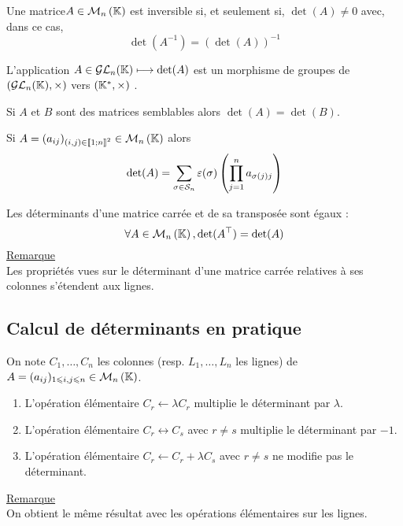 \begin{defprop}
    Une matrice\( A \in  \M{n}\) est inversible si, et seulement si, \(\det(A) \neq 0\) avec, dans ce cas, \[\det(A^{-1}) = (\det(A))^{-1}\]
\end{defprop}

\begin{defprop}
    L’application \(A \in  \mathcal{GL}_n(\mathbb{K}) \longmapsto \det(A)\) est un morphisme de groupes de \((\mathcal{GL}_n(\mathbb{K}), \times)\) vers \((\mathbb{K}^*, \times)\) .
\end{defprop}

\begin{defprop}
    Si \(A\) et \(B\) sont des matrices semblables alors \(\det(A) = \det(B)\).
\end{defprop}
\begin{defprop}
    Si \(A = (a_{ij} )_{(i,j)\in \interventierii{1}{n}^2} \in \M{n}\) alors
    \[\det (A) = \sum_{\sigma \in \mathcal{S}_n} \varepsilon (\sigma ) \left(\prod^n_{j=1} a_{\sigma(j)j}\right)\]
\end{defprop}

\begin{defprop}
    Les déterminants d’une matrice carrée et de sa transposée sont égaux :
    \[\forall A \in  \M{n} , \det(\trans{A}) = \det(A)\]
    \underline{Remarque}\\
    Les propriétés vues sur le déterminant d’une matrice carrée relatives à ses colonnes s’étendent aux lignes.
\end{defprop}

\subsection{Calcul de déterminants en pratique}
    On note \(C_1, \dots  , C_n\) les colonnes (resp. \(L_1, \dots  , L_n\) les lignes) de \(A = (a_{ij} )_{1\leq i,j\leq n} \in  \M{n}\).
\begin{defprop}
    \begin{enumerate}
        \item L’opération élémentaire \(C_r \leftarrow \lambda C_r\) multiplie le déterminant par \(\lambda\).
        \item L’opération élémentaire \(C_r \leftrightarrow C_s\) avec \(r\neq s\) multiplie le déterminant par \(-1\).
        \item L’opération élémentaire \(C_r \leftarrow C_r + \lambda C_s\) avec \(r\neq s\) ne modifie pas le déterminant.
    \end{enumerate}
    \underline{Remarque}\\
    On obtient le même résultat avec les opérations élémentaires sur les lignes.
\end{defprop}

